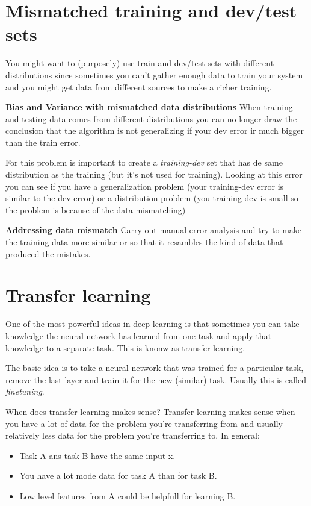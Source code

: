 \section*{Mismatched training and dev/test sets}

You might want to (purposely) use train and dev/test sets with different distributions since
sometimes you can't gather enough data to train your system and you might get data from different
sources to make a richer training. 

\textbf{Bias and Variance with mismatched data distributions} When training and testing 
data comes from different distributions you can no longer draw the conclusion that the 
algorithm is not generalizing if your dev error ir much bigger than the train error. 

For this problem is important to create a \textit{training-dev} set that has de same distribution
as the training (but it's not used for training). Looking at this error you can see if you 
have a generalization problem (your training-dev error is similar to the dev error) or a
distribution problem (you training-dev is small so the problem is because of the data mismatching)

\textbf{Addressing data mismatch}  Carry out manual error analysis and try to make the training
data more similar or so that it resambles the kind of data that produced the mistakes.

\section*{Transfer learning}

One of the most powerful ideas in deep learning is that sometimes you can take knowledge 
the neural network has learned from one task and apply that knowledge to a separate task.
This is knonw as transfer learning.

The basic idea is to take a neural network that was trained for a particular task, remove
the last layer and train it for the new (similar) task. Usually this is called \textit{finetuning}. 

When does transfer learning makes sense? Transfer learning makes sense when you have a 
lot of data for the problem you're transferring from and usually relatively less 
data for the problem you're transferring to. In general:

\begin{itemize}
    \item Task A ans task B have the same input x.
    \item You have a lot mode data for task A than for task B. 
    \item Low level features from A could be helpfull for learning B.
\end{itemize}

